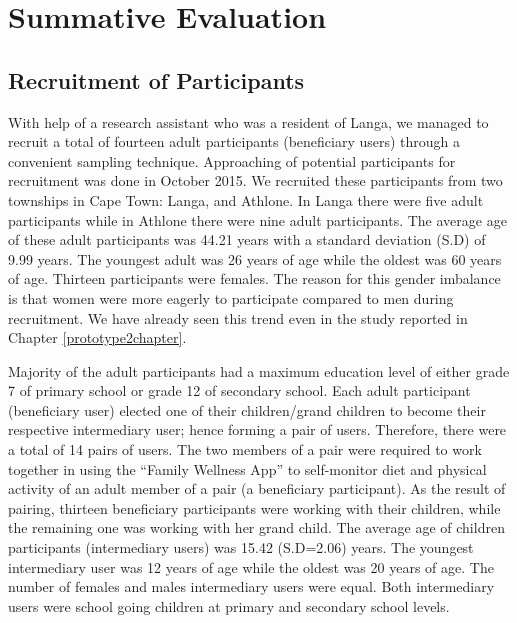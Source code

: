 
\chapter{Summative Evaluation} %

\label{summativeevalchapter} %


\section{Recruitment of Participants}
With help of a research assistant who was a resident of Langa,  we managed to recruit a total of fourteen adult participants (beneficiary users) through a convenient sampling technique. Approaching of potential participants for recruitment was done in October 2015. We recruited these participants from two townships in Cape Town: Langa, and Athlone. In Langa there were five adult participants while in Athlone there were nine adult participants. The average age of these adult participants was 44.21 years with a standard deviation (S.D) of 9.99 years. The youngest adult was 26 years of age while the oldest was 60 years of age. Thirteen participants were females. The reason for this gender imbalance is that women were more eagerly to participate compared to men during recruitment. We have already seen this trend even in the study reported in Chapter \ref{prototype2chapter}.

Majority of the adult participants had a maximum education level of either grade 7 of primary school or grade 12 of secondary school. Each adult participant (beneficiary user) elected one of their children/grand children to become their respective intermediary user; hence forming a pair of users. Therefore, there were a total of 14 pairs of users. The two members of a pair were required to work together in using the ``Family Wellness App'' to self-monitor diet and physical activity of an adult member of a pair (a beneficiary participant). As the result of pairing, thirteen beneficiary participants  were working with their children, while the remaining one was working with her grand child. The average age of children participants (intermediary users) was 15.42 (S.D=2.06) years. The youngest intermediary user was 12 years of age while the oldest was 20 years of age. The number of females and males intermediary users were equal. Both intermediary users were school going children at primary and secondary school levels.


